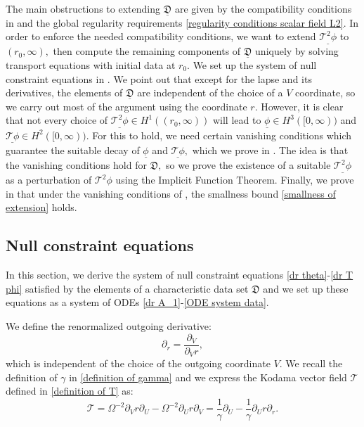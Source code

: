 \documentclass[11pt]{article}
\numberwithin{equation}{section}
\begin{document}
The main obstructions to extending $\underline{\mathfrak{D}}$ are given by the compatibility conditions in  and the global regularity requirements \eqref{regularity conditions scalar field L2}. In order to enforce the needed compatibility conditions, we want to extend $\underline{\mathcal{T}^2\phi}$ to $(r_0,\infty),$ then compute the remaining components of $\underline{\mathfrak{D}}$ uniquely by solving transport equations with initial data at $r_0$. We set up the system of null constraint equations in . We point out that except for the lapse and its derivatives, the elements of $\underline{\mathfrak{D}}$ are independent of the choice of a $V$ coordinate, so we carry out most of the argument using the coordinate $r$. However, it is clear that not every choice of $\underline{\mathcal{T}^2\phi}\in H^1((r_0,\infty))$ will lead to $\underline{\phi}\in H^3([0,\infty))$ and $\underline{\mathcal{T}\phi}\in H^2([0,\infty)).$ For this to hold, we need certain vanishing conditions which guarantee the suitable decay of $\underline{\phi}$ and $\underline{\mathcal{T}\phi},$ which we prove in . The idea is that the vanishing conditions hold for $\mathfrak{D},$ so we prove the existence of a suitable $\underline{\mathcal{T}^2\phi}$ as a perturbation of $\mathcal{T}^2\phi$ using the Implicit Function Theorem. Finally, we prove in  that under the vanishing conditions of , the smallness bound \eqref{smallness of extension} holds.

\subsection{Null constraint equations}\label{null constraint section}

In this section, we derive the system of null constraint equations \eqref{dr theta}-\eqref{dr T phi} satisfied by the elements of a characteristic data set $\mathfrak{D}$ and we set up these equations as a system of ODEs \eqref{dr A_1}-\eqref{ODE system data}.

We define the renormalized outgoing derivative:
\[\partial_r=\frac{\partial_V}{\partial_Vr},\]
which is independent of the choice of the outgoing  coordinate $V.$ We recall the definition of $\gamma$ in \eqref{definition of gamma} and we express the Kodama vector field $\mathcal{T}$ defined in \eqref{definition of T} as:
\[\mathcal{T}=\Omega^{-2}\partial_Vr\partial_U-\Omega^{-2}\partial_Ur\partial_V=\frac{1}{\gamma}\partial_U-\frac{1}{\gamma}\partial_Ur\partial_r.\]
\end{document}
